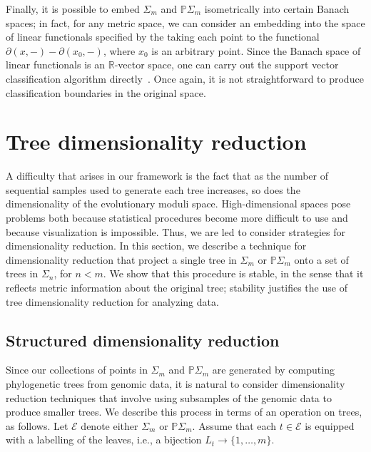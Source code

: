 \documentclass[a4paper,11pt]{article}
\newcommand{\aE}{\mathcal{E}}
\begin{document}
Finally, it is possible to embed $\Sigma_m$ and $\mathbb{P}\Sigma_m$ isometrically into certain Banach spaces; in fact, for any metric space, we can consider an embedding into the space of linear functionals specified by the taking each point to the functional $\partial(x,-) - \partial(x_0,-)$, where $x_0$ is an arbitrary point.
Since the Banach space of linear functionals is an $\mathbb{R}$-vector space, one can carry out the support vector classification algorithm directly~\cite{hein2003}.
Once again, it is not straightforward to produce classification boundaries in the original space.



\section{Tree dimensionality reduction}\label{sec:treedimred}

A difficulty that arises in our framework is the fact that as the number of sequential samples used to generate each tree increases, so does the dimensionality of the evolutionary moduli space.
High-dimensional spaces pose problems both because statistical procedures become more difficult to use and because visualization is impossible.
Thus, we are led to consider strategies for dimensionality reduction.
In this section, we describe a technique for dimensionality reduction that project a single tree in $\Sigma_m$ or $\mathbb{P}\Sigma_m$ onto a set of trees in $\Sigma_{n}$, for $n < m$.  We show that this procedure is stable, in the sense that it reflects metric information about the original tree; stability justifies the use of tree dimensionality reduction for analyzing data.

\subsection{Structured dimensionality reduction}

Since our collections of points in $\Sigma_m$ and $\mathbb{P}\Sigma_m$ are generated by computing phylogenetic trees from genomic data, it is natural to consider dimensionality reduction techniques that involve using subsamples of the genomic data to produce smaller trees.
We describe this process in terms of an operation on trees, as follows.  
Let $\aE$ denote either $\Sigma_m$ or $\mathbb{P}\Sigma_m$.  
Assume that each $t \in \aE$ is equipped with a labelling of the leaves, i.e., a bijection $L_t \to \{1,\ldots,m\}$.
\end{document}
